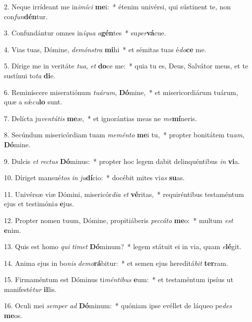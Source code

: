 2. Neque irrídeant me in\textit{i}\textit{mí}\textit{ci} \textbf{me}i:~*  étenim univérsi, qui sústinent te, non con\textit{fun}\textbf{dén}tur.\

3. Confundántur omnes in\textit{í}\textit{qua} \textit{a}\textbf{gén}tes~*  su\textit{per}\textbf{vá}cue.\

4. Vias tuas, Dómine, \textit{de}\textit{móns}\textit{tra} \textbf{mi}hi~*  et sémitas tuas é\textit{do}\textbf{ce} me.\

5. Dírige me in veritáte \textit{tu}\textit{a}, \textit{et} \textbf{do}ce me:~*  quia tu es, Deus, Salvátor meus, et te sustínui to\textit{ta} \textbf{di}e.\

6. Reminíscere miseratiónum \textit{tu}\textit{á}\textit{rum}, \textbf{Dó}mine,~*  et misericordiárum tuárum, quæ a sǽ\textit{cu}\textbf{lo} sunt.\

7. Delícta ju\textit{ven}\textit{tú}\textit{tis} \textbf{me}æ,~*  et ignorántias meas ne \textit{me}\textbf{mí}neris.\

8. Secúndum misericórdiam tuam \textit{me}\textit{mén}\textit{to} \textbf{me}i tu,~*  propter bonitátem tu\textit{am}, \textbf{Dó}mine.\

9. Dulcis \textit{et} \textit{rec}\textit{tus} \textbf{Dó}minus:~*  propter hoc legem dabit delinquéntibus \textit{in} \textbf{vi}a.\

10. Díriget mansué\textit{tos} \textit{in} \textit{ju}\textbf{dí}cio:~*  docébit mites vi\textit{as} \textbf{su}as.\

11. Univérsæ viæ Dómini, misericór\textit{di}\textit{a} \textit{et} \textbf{vé}ritas,~*  requiréntibus testaméntum ejus et testimóni\textit{a} \textbf{e}jus.\

12. Propter nomen tuum, Dómine, propitiáberis \textit{pec}\textit{cá}\textit{to} \textbf{me}o:~*  multum \textit{est} \textbf{e}nim.\

13. Quis est homo \textit{qui} \textit{ti}\textit{met} \textbf{Dó}minum?~*  legem státuit ei in via, quam \textit{e}\textbf{lé}git.\

14. Anima ejus in bo\textit{nis} \textit{de}\textit{mo}\textbf{rá}bitur:~*  et semen ejus hereditá\textit{bit} \textbf{ter}ram.\

15. Firmaméntum est Dóminus ti\textit{mén}\textit{ti}\textit{bus} \textbf{e}um:~*  et testaméntum ipsíus ut manifesté\textit{tur} \textbf{il}lis.\

16. Oculi mei \textit{sem}\textit{per} \textit{ad} \textbf{Dó}minum:~*  quóniam ipse evéllet de láqueo pe\textit{des} \textbf{me}os.\

